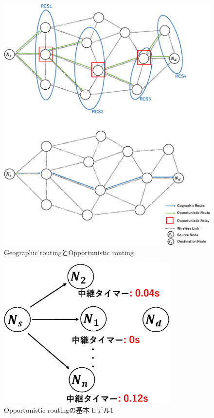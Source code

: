 \documentclass[10pt]{jreport}
\begin{document}
\begin{figure}[!ht]
	\centering
	\includegraphics[width=150mm]{figures/difference_geographic_opportunistic.eps}
	\caption{Geographic routingとOpportunistic routing}
	\label{fig:Gegraphic_opportunistic}
\end{figure}

\begin{figure}[!ht]
	\centering
	\includegraphics[width=90mm]{figures/basic-opportunity1.eps}
	\caption{Opportunistic routingの基本モデル1}
	\label{fig:Basic1}
\end{figure}
\end{document}
